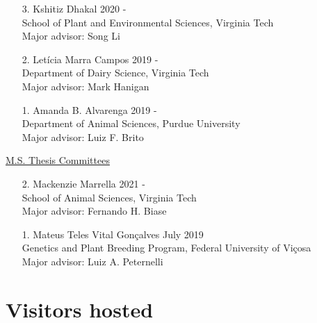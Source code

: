 \documentclass[margin,line,10pt]{res}
\begin{document}
\begin{resume}
\begin{enumerate}
  \vspace{0.3cm}
  
  \item [3.] Kshitiz Dhakal \hfill 2020 - \\
  School of Plant and Environmental Sciences,  Virginia Tech \\
  Major advisor: Song Li

  \vspace{0.3cm}

  \item [2.] Let\'{i}cia Marra Campos  \hfill 2019 - \\
  Department of Dairy Science,  Virginia Tech \\ 
  Major advisor: Mark Hanigan

  \vspace{0.3cm}

\item [1.] Amanda B. Alvarenga   \hfill 2019 - \\
  Department of Animal Sciences, Purdue University \\
  Major advisor: Luiz F. Brito
\end{enumerate}


\begin{flushleft}
\hspace{0.2cm} \underline{M.S. Thesis Committees}
\end{flushleft}


\begin{enumerate}
  \item [2.] Mackenzie Marrella \hfill 2021 - \\
    School of Animal Sciences, Virginia Tech\\
    Major advisor: Fernando H. Biase
  \end{enumerate}

\vspace{0.3cm}

\begin{enumerate}
\item [1.] Mateus Teles Vital Gon\c calves  \hfill July 2019 \\
  Genetics and Plant Breeding Program, Federal University of  Vi\c cosa\\
  Major advisor: Luiz A. Peternelli
\end{enumerate}


\vspace{0.5cm}
\section{\sc Visitors hosted}


\end{resume}
\end{document}
